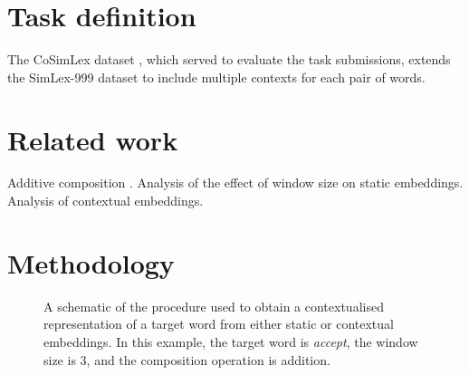 \section{Task definition}
\label{task-definition}

The CoSimLex dataset \parencite{Armendariz2020}, which served to evaluate the task
submissions, extends the SimLex-999 dataset \parencite{Hill2015} to include multiple
contexts for each pair of words.

\section{Related work}

Additive composition \parencites[e.g.][]{Kintsch2001}{Mitchell2008}{Mikolov2013a}.
Analysis of the effect of window size on static embeddings.
Analysis of contextual embeddings.

\section{Methodology}

\begin{figure}
  \centering
  \captionsetup{justification=centering}
  \newcommand{\period}{.}
  \newcommand*{\orawidest}{accept}
  \newcommand*{\oratallest}{\#\#}
  \newlength{\orawidth}
  \settowidth{\orawidth}{\orawidest}
  \newcommand*{\ora}[1]{\overrightarrow{#1\vphantom{\oratallest}}}
  \caption{A schematic of the procedure used to obtain a contextualised representation
    of a target word from either static or contextual embeddings. In this example, the
    target word is \emph{accept}, the window size is $3$, and the composition operation
    is addition.}
\end{figure}


